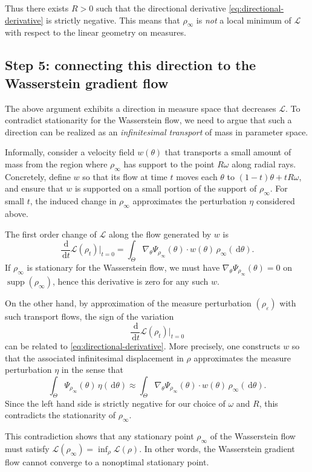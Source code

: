 \documentclass[11pt]{article}
\numberwithin{equation}{section}
\theoremstyle{definition}
\newcommand{\dd}{\,\mathrm{d}}
\newcommand{\1}{\mathbbm{1}}
\begin{document}
Thus there exists $R>0$ such that the directional derivative \eqref{eq:directional-derivative} is strictly negative. This means that $\rho_\infty$ is \emph{not} a local minimum of $\mathcal{L}$ with respect to the linear geometry on measures.

\subsection{Step 5: connecting this direction to the Wasserstein gradient flow}

The above argument exhibits a direction in measure space that decreases $\mathcal{L}$. To contradict stationarity for the Wasserstein flow, we need to argue that such a direction can be realized as an \emph{infinitesimal transport} of mass in parameter space.

Informally, consider a velocity field $w(\theta)$ that transports a small amount of mass from the region where $\rho_\infty$ has support to the point $R\omega$ along radial rays. Concretely, define $w$ so that its flow at time $t$ moves each $\theta$ to $(1-t)\theta + t R\omega$, and ensure that $w$ is supported on a small portion of the support of $\rho_\infty$. For small $t$, the induced change in $\rho_\infty$ approximates the perturbation $\eta$ considered above.

The first order change of $\mathcal{L}$ along the flow generated by $w$ is
\[
\frac{\dd}{\dd t}\mathcal{L}(\rho_t)\bigg|_{t=0}
= \int_\Theta \nabla_\theta\Psi_{\rho_\infty}(\theta)\cdot w(\theta)\,\rho_\infty(\dd\theta).
\]
If $\rho_\infty$ is stationary for the Wasserstein flow, we must have $\nabla_\theta\Psi_{\rho_\infty}(\theta)=0$ on $\operatorname{supp}(\rho_\infty)$, hence this derivative is zero for any such $w$.

On the other hand, by approximation of the measure perturbation $(\rho_\varepsilon)$ with such transport flows, the sign of the variation
\[
\frac{\dd}{\dd t}\mathcal{L}(\rho_t)\bigg|_{t=0}
\]
can be related to \eqref{eq:directional-derivative}. More precisely, one constructs $w$ so that the associated infinitesimal displacement in $\rho$ approximates the measure perturbation $\eta$ in the sense that
\[
\int_\Theta \Psi_{\rho_\infty}(\theta)\,\eta(\dd\theta)
\approx \int_\Theta \nabla_\theta\Psi_{\rho_\infty}(\theta)\cdot w(\theta)\,\rho_\infty(\dd\theta).
\]
Since the left hand side is strictly negative for our choice of $\omega$ and $R$, this contradicts the stationarity of $\rho_\infty$.

This contradiction shows that any stationary point $\rho_\infty$ of the Wasserstein flow must satisfy $\mathcal{L}(\rho_\infty) = \inf_\rho \mathcal{L}(\rho)$. In other words, the Wasserstein gradient flow cannot converge to a nonoptimal stationary point.
\end{document}
